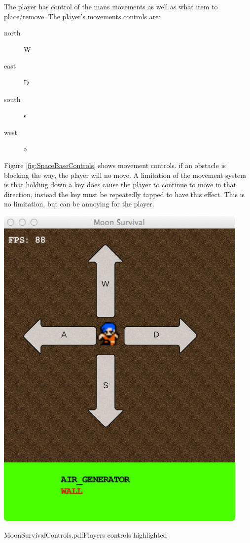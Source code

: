 The player has control of the mans movements as well as what item to place/remove.
The player's movements controls are:
\begin{description}
\item [north] W
\item [east] D
\item [south] s
\item [west] a
\end{description}
Figure \ref{fig:SpaceBaseControls} shows movement controls.
if an obstacle is blocking the way, the player will no move.
A limitation of the movement system is that holding down a key does cause the player to continue to move in that direction, instead the key must be repeatedly tapped to have this effect. This is no limitation, but can be annoying for the player.

\begin{marginfigure}
	\includegraphics{res/space_base_prototype/MoonSurvivalControls.pdf}
	\caption{MoonSurvivalControls.pdfPlayers controls highlighted}
	\label{fig:SpaceBaseControls}
\end{marginfigure}

